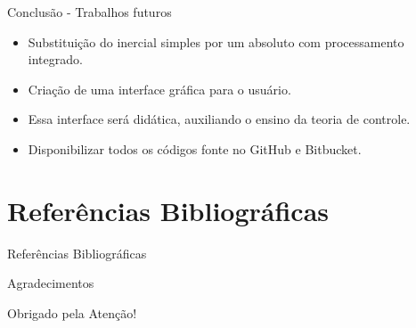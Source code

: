 \documentclass[aspectratio=169]{beamer}
\begin{document}

\begin{frame}{Conclusão - Trabalhos futuros}
    \begin{itemize}
        \justifying
		\item Substituição do inercial simples por um absoluto com processamento integrado. 
		\item Criação de uma interface gráfica para o usuário.
		\item Essa interface será didática, auxiliando o ensino da teoria de controle.  
		\item Disponibilizar todos os códigos fonte no GitHub e Bitbucket.
		\end{itemize}
\end{frame}


\section{Referências Bibliográficas}
\begin{frame}{Referências Bibliográficas}
	
\end{frame}


\begin{frame}{Agradecimentos}
		\begin{center}
			{\Huge Obrigado pela Atenção!}
		\end{center}
\end{frame}
\end{document}
